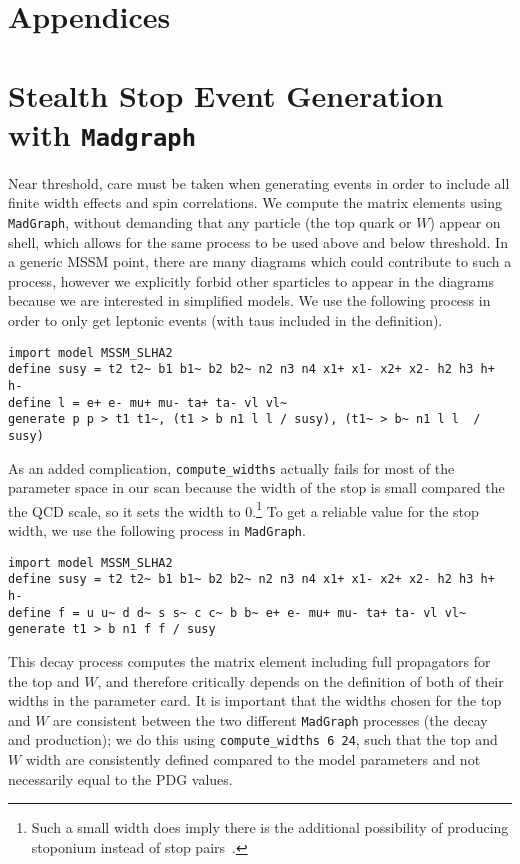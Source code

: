 \documentclass[a4paper,12pt]{article}
\begin{document}
\appendix
\section*{Appendices}

\section{Stealth Stop Event Generation with \texttt{Madgraph}}
\label{sec:eventgen}

Near threshold, care must be taken when generating events in order to include all finite width effects and spin correlations. We compute the matrix elements using \texttt{MadGraph}, without demanding that any particle (the top quark or $W$) appear on shell, which allows for the same process to be used above and below threshold. In a generic MSSM point, there are many diagrams which could contribute to such a process, however we explicitly forbid other sparticles to appear in the diagrams because we are interested in simplified models. We use the following process in order to only get leptonic events (with taus included in the definition).
\begin{lstlisting}[basicstyle=\ttfamily\small]
import model MSSM_SLHA2
define susy = t2 t2~ b1 b1~ b2 b2~ n2 n3 n4 x1+ x1- x2+ x2- h2 h3 h+ h-
define l = e+ e- mu+ mu- ta+ ta- vl vl~
generate p p > t1 t1~, (t1 > b n1 l l / susy), (t1~ > b~ n1 l l  / susy)
\end{lstlisting}
%
 As an added complication, \texttt{compute\_widths} actually fails for most of the parameter space in our scan because the width of the stop is small compared the the QCD scale, so it sets the width to 0.\footnote{Such a small width does imply there is the additional possibility of producing stoponium instead of stop pairs~\cite{Martin:2008sv,Martin:2009dj,Younkin:2009zn,Kumar:2014bca,Batell:2015zla}.} To get a reliable value for the stop width, we use the following process in \texttt{MadGraph}.
%
\begin{lstlisting}[basicstyle=\ttfamily\small]
import model MSSM_SLHA2
define susy = t2 t2~ b1 b1~ b2 b2~ n2 n3 n4 x1+ x1- x2+ x2- h2 h3 h+ h-
define f = u u~ d d~ s s~ c c~ b b~ e+ e- mu+ mu- ta+ ta- vl vl~
generate t1 > b n1 f f / susy
\end{lstlisting}
This decay process computes the matrix element including full propagators for the top and $W$, and therefore critically depends on the definition of both of their widths in the parameter card. It is important that the widths chosen for the top and $W$ are consistent between the two different \texttt{MadGraph} processes (the decay and production); we do this using \texttt{compute\_widths 6 24}, such that the top and $W$ width are consistently defined compared to the model parameters and not necessarily equal to the PDG values. 
\end{document}
